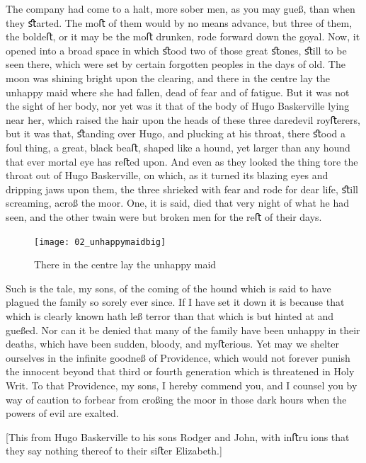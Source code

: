 \documentclass[paper=5.5in:8.5in,BCOR=7mm,twoside,DIV=calc,12pt,usegeometry,openany,chapterprefix,endperiod,headings=big]{scrbook} %
\begin{document}
The company had come to a halt, more sober men, as you may gueß, than when they ﬆarted. The moﬅ of them would by no means advance, but three of them, the boldeﬅ, or it may be the moﬅ drunken, rode forward down the goyal. Now, it opened into a broad space in which ﬆood two of those great ﬆones, ﬆill to be seen there, which were set by certain forgotten peoples in the days of old. The moon was shining bright upon the clearing, and there in the centre lay the unhappy maid where she had fallen, dead of fear and of fatigue. But it was not the sight of her body, nor yet was it that of the body of Hugo Baskerville lying near her, which raised the hair upon the heads of these three daredevil royﬅerers, but it was that, ﬆanding over Hugo, and plucking at his throat, there ﬆood a foul thing, a great, black beaﬅ, shaped like a hound, yet larger than any hound that ever mortal eye has reﬅed upon. And even as they looked the thing tore the throat out of Hugo Baskerville, on which, as it turned its blazing eyes and dripping jaws upon them, the three shrieked with fear and rode for dear life, ﬆill screaming, acroß the moor. One, it is said, died that very night of what he had seen, and the other twain were but broken men for the reﬅ of their days.

\begin{figure}[tbph]
\centering
\texttt{[image: 02\_unhappymaidbig]}
\caption{There in the centre lay the unhappy maid}
\end{figure}

Such is the tale, my sons, of the coming of the hound which is said to have plagued the family so sorely ever since. If I have set it down it is because that which is clearly known hath leß terror than that which is but hinted at and gueßed. Nor can it be denied that many of the family have been unhappy in their deaths, which have been sudden, bloody, and myﬅerious. Yet may we shelter ourselves in the inﬁnite goodneß of Providence, which would not forever punish the innocent beyond that third or fourth generation which is threatened in Holy Writ. To that Providence, my sons, I hereby commend you, and I counsel you by way of caution to forbear from croßing the moor in those dark hours when the powers of evil are exalted.

[This from Hugo Baskerville to his sons Rodger and John, with inﬅruions that they say nothing thereof to their siﬅer Elizabeth.]



\vfill

\normalfont
\end{document}
